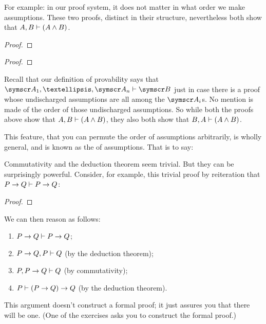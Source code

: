 For example: in our proof system, it does not matter in what order we make assumptions. These two proofs, distinct in their structure, nevertheless both show that $A, B \vdash (A \wedge B)$. 
\begin{multicols}{2}\noindent\begin{proof}
	\open
\end{proof}\qquad \begin{proof}
	\open
\end{proof}\end{multicols} 

Recall that our definition of provability says that $\meta{A}_{1},…, \meta{A}_{n}\vdash \meta{B}$ just in case there is a proof whose undischarged assumptions are all among the $\meta{A}_{i}$s. No mention is made of the order of those undischarged assumptions. So while both the proofs above show that $A, B \vdash (A \wedge B)$, they also both show that $B, A \vdash (A \wedge B)$.

This feature, that you can permute the order of assumptions arbitrarily, is wholly general, and is known as the  of assumptions. That is to say: 

Commutativity and the deduction theorem seem trivial. But they can be surprisingly powerful. Consider, for example, this trivial proof by reiteration that $P \rightarrow Q \vdash P \rightarrow Q$: \begin{proof}
\end{proof} We can then reason as follows: \begin{enumerate}
	\item $P \rightarrow Q \vdash P \rightarrow Q$;
	\item $P \rightarrow Q, P \vdash Q$ (by the deduction theorem);
	\item $P, P \rightarrow Q \vdash Q$ (by commutativity);
	\item $P \vdash (P  \rightarrow Q) \rightarrow Q$ (by the deduction theorem).
\end{enumerate} This argument doesn't construct a formal proof; it just assures you that there will be one. (One of the exercises asks you to construct the formal proof.)

